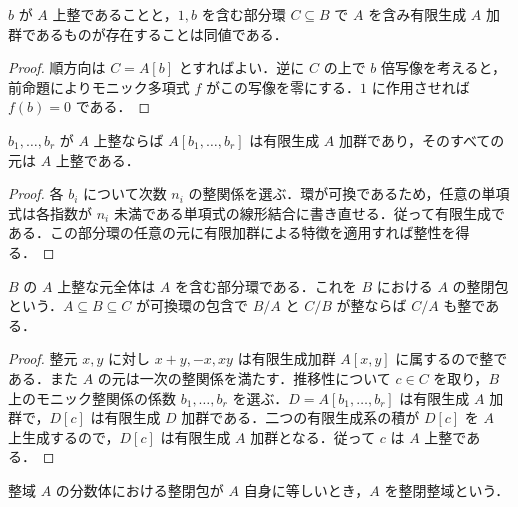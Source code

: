 \begin{prop}[整元の有限加群による特徴]
$b$ が $A$ 上整であることと，$1,b$ を含む部分環 $C\subseteq B$ で $A$ を含み有限生成 $A$ 加群であるものが存在することは同値である．
\end{prop}
\begin{proof}
順方向は $C=A[b]$ とすればよい．逆に $C$ の上で $b$ 倍写像を考えると，前命題によりモニック多項式 $f$ がこの写像を零にする．$1$ に作用させれば $f(b)=0$ である．
\end{proof}
\begin{prop}[有限個の整元による添加]
$b_1,\ldots,b_r$ が $A$ 上整ならば $A[b_1,\ldots,b_r]$ は有限生成 $A$ 加群であり，そのすべての元は $A$ 上整である．
\end{prop}
\begin{proof}
各 $b_i$ について次数 $n_i$ の整関係を選ぶ．環が可換であるため，任意の単項式は各指数が $n_i$ 未満である単項式の線形結合に書き直せる．従って有限生成である．この部分環の任意の元に有限加群による特徴を適用すれば整性を得る．
\end{proof}
\begin{prop}[整閉包と整性の推移性]
$B$ の $A$ 上整な元全体は $A$ を含む部分環である．これを $B$ における $A$ の整閉包という．$A\subseteq B\subseteq C$ が可換環の包含で $B/A$ と $C/B$ が整ならば $C/A$ も整である．
\end{prop}
\begin{proof}
整元 $x,y$ に対し $x+y,-x,xy$ は有限生成加群 $A[x,y]$ に属するので整である．また $A$ の元は一次の整関係を満たす．推移性について $c\in C$ を取り，$B$ 上のモニック整関係の係数 $b_1,\ldots,b_r$ を選ぶ．$D=A[b_1,\ldots,b_r]$ は有限生成 $A$ 加群で，$D[c]$ は有限生成 $D$ 加群である．二つの有限生成系の積が $D[c]$ を $A$ 上生成するので，$D[c]$ は有限生成 $A$ 加群となる．従って $c$ は $A$ 上整である．
\end{proof}
\begin{defn}[整閉整域]
整域 $A$ の分数体における整閉包が $A$ 自身に等しいとき，$A$ を整閉整域という．
\end{defn}
